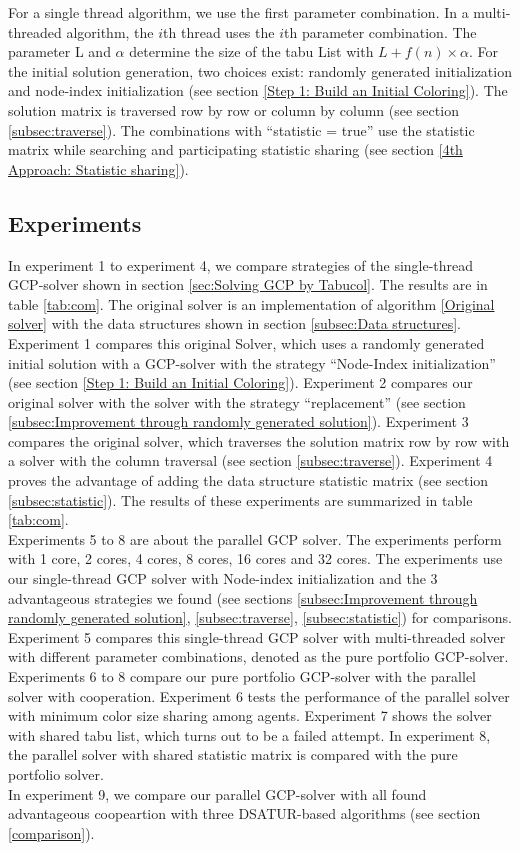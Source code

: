 \documentclass[12pt,a4paper,twoside]{scrartcl}
\numberwithin{equation}{section}
\begin{document}
For a single thread algorithm, we use the first parameter combination. In a multi-threaded algorithm, the $i$th thread uses the $i$th parameter combination. The parameter L and $\alpha$ determine the size of the tabu List with  $L+ f(n)\times \alpha$. For the initial solution generation, two choices exist: randomly generated initialization and node-index initialization (see section \ref{Step 1: Build an Initial Coloring}). The solution matrix is traversed row by row or column by column (see section \ref{subsec:traverse}). The combinations with ``statistic = true'' use the statistic matrix while searching and participating statistic sharing (see section \ref{4th Approach: Statistic sharing}).
\clearpage
\subsection{Experiments}
In experiment 1 to experiment 4, we compare strategies of the single-thread GCP-solver shown in section \ref{sec:Solving GCP by Tabucol}. The results are in table \ref{tab:com}. The original solver is an implementation of algorithm \ref{Original solver} with the data structures shown in section \ref{subsec:Data structures}. Experiment 1 compares this original Solver, which uses a randomly generated initial solution with a GCP-solver with the strategy ``Node-Index initialization'' (see section \ref{Step 1: Build an Initial Coloring}). Experiment 2 compares our original solver with the solver with the strategy ``replacement'' (see section \ref{subsec:Improvement through randomly generated solution}). Experiment 3 compares the original solver, which traverses the solution matrix row by row with a solver with the column traversal (see section \ref{subsec:traverse}). Experiment 4 proves the advantage of adding the data structure statistic matrix (see section \ref{subsec:statistic}). The results of these experiments are summarized in table \ref{tab:com}.\\
Experiments 5 to 8 are about the parallel GCP solver. The experiments perform with 1 core, 2 cores, 4 cores, 8 cores, 16 cores and 32 cores. The experiments use our single-thread GCP solver with Node-index initialization and the 3 advantageous strategies we found (see sections \ref{subsec:Improvement through randomly generated solution}, \ref{subsec:traverse},  \ref{subsec:statistic}) for comparisons. Experiment 5 compares this single-thread GCP solver with multi-threaded solver with different parameter combinations, denoted as the pure portfolio GCP-solver. Experiments 6 to 8 compare our pure portfolio GCP-solver with the parallel solver with cooperation. Experiment 6 tests the performance of the parallel solver with minimum color size sharing among agents. Experiment 7 shows the solver with shared tabu list, which turns out to be a failed attempt. In experiment 8, the parallel solver with shared statistic matrix is compared with the pure portfolio solver. \\
In experiment 9, we compare our parallel GCP-solver with all found advantageous coopeartion with three DSATUR-based algorithms (see section \ref{comparison}).
\clearpage
\end{document}
